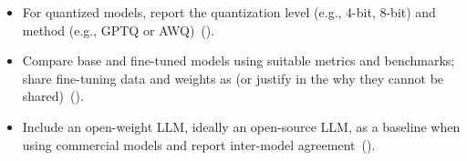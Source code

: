 \begin{itemize}[label={},leftmargin=*]
    \item \iconS {} For quantized models, report the quantization level (e.g., 4-bit, 8-bit) and method (e.g., GPTQ or AWQ)~().
    \item \iconS {} Compare base and fine-tuned models using suitable metrics and benchmarks; share fine-tuning data and weights as \supplementarymaterial (or justify in the \paper why they cannot be shared)~().
    \item \iconS {} Include an open-weight LLM, ideally an open-source LLM, as a baseline when using commercial models and report inter-model agreement~().
\end{itemize}


